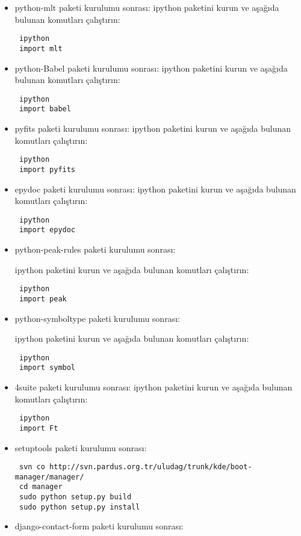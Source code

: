 \documentclass[a4paper,10pt]{article}
\begin{document}
\begin{itemize}
\item python-mlt paketi kurulumu sonrası:
ipython paketini kurun ve aşağıda bulunan komutları çalıştırın:
\begin{verbatim}
 ipython
 import mlt
\end{verbatim}


\item python-Babel paketi kurulumu sonrası:
ipython paketini kurun ve aşağıda bulunan komutları çalıştırın:
\begin{verbatim}
 ipython
 import babel
\end{verbatim}

\item pyfits paketi kurulumu sonrası:
ipython paketini kurun ve aşağıda bulunan komutları çalıştırın:
\begin{verbatim}
 ipython
 import pyfits
\end{verbatim}


\item epydoc paketi kurulumu sonrası:
ipython paketini kurun ve aşağıda bulunan komutları çalıştırın:
\begin{verbatim}
 ipython
 import epydoc
\end{verbatim}

\item python-peak-rules paketi kurulumu sonrası:

ipython paketini kurun ve aşağıda bulunan komutları çalıştırın:
\begin{verbatim}
 ipython
 import peak
\end{verbatim}

\item python-symboltype paketi kurulumu sonrası:

ipython paketini kurun ve aşağıda bulunan komutları çalıştırın:
\begin{verbatim}
 ipython
 import symbol
\end{verbatim}

\item 4suite paketi kurulumu sonrası:
ipython paketini kurun ve aşağıda bulunan komutları çalıştırın:
\begin{verbatim}
 ipython
 import Ft
\end{verbatim}


\item setuptools paketi kurulumu sonrası:
\begin{verbatim}
 svn co http://svn.pardus.org.tr/uludag/trunk/kde/boot-manager/manager/
 cd manager
 sudo python setup.py build 
 sudo python setup.py install
\end{verbatim}
\item django-contact-form paketi kurulumu sonrası:


\end{itemize}
\end{document}
